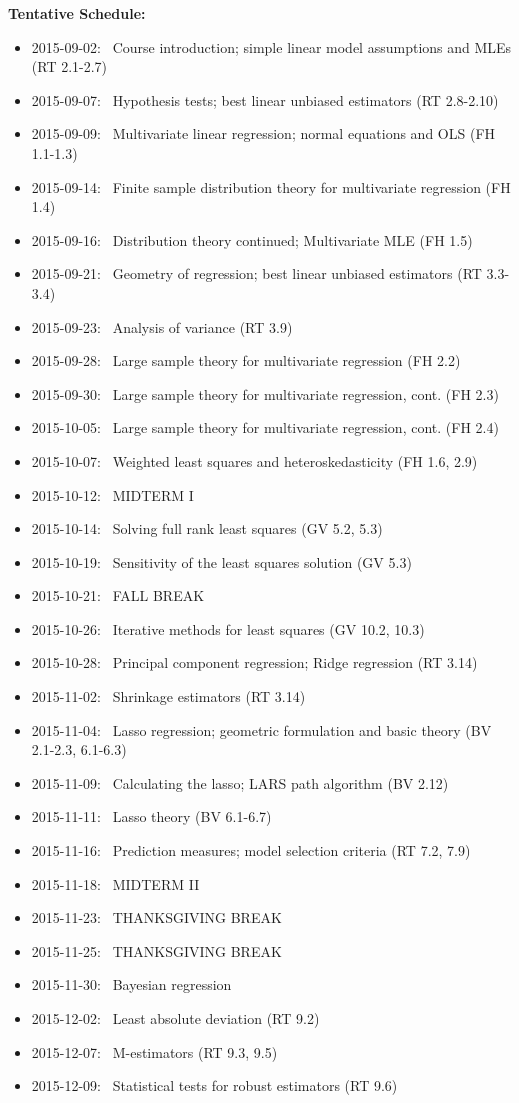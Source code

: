 \documentclass[12pt]{article}
\begin{document}
{\bf Tentative Schedule:}
\begin{itemize}\setlength\itemsep{0em}
\item 2015-09-02: \, Course introduction; simple linear model assumptions and MLEs (RT 2.1-2.7)
\item 2015-09-07: \, Hypothesis tests; best linear unbiased estimators (RT 2.8-2.10)
\item 2015-09-09: \, Multivariate linear regression; normal equations and OLS (FH 1.1-1.3)
\item 2015-09-14: \, Finite sample distribution theory for multivariate regression (FH 1.4)
\item 2015-09-16: \, Distribution theory continued; Multivariate MLE (FH 1.5)
\item 2015-09-21: \, Geometry of regression; best linear unbiased estimators (RT 3.3-3.4)
\item 2015-09-23: \, Analysis of variance (RT 3.9)
\item 2015-09-28: \, Large sample theory for multivariate regression (FH 2.2)
\item 2015-09-30: \, Large sample theory for multivariate regression, cont. (FH 2.3)
\item 2015-10-05: \, Large sample theory for multivariate regression, cont. (FH 2.4)
\item 2015-10-07: \, Weighted least squares and heteroskedasticity (FH 1.6, 2.9)
\item 2015-10-12: \, MIDTERM I
\item 2015-10-14: \, Solving full rank least squares (GV 5.2, 5.3)
\item 2015-10-19: \, Sensitivity of the least squares solution (GV 5.3)
\item 2015-10-21: \, FALL BREAK
\item 2015-10-26: \, Iterative methods for least squares (GV 10.2, 10.3)
\item 2015-10-28: \, Principal component regression; Ridge regression (RT 3.14)
\item 2015-11-02: \, Shrinkage estimators (RT 3.14)
\item 2015-11-04: \, Lasso regression; geometric formulation and basic theory (BV 2.1-2.3, 6.1-6.3)
\item 2015-11-09: \, Calculating the lasso; LARS path algorithm (BV 2.12)
\item 2015-11-11: \, Lasso theory (BV 6.1-6.7)
\item 2015-11-16: \, Prediction measures; model selection criteria (RT 7.2, 7.9)
\item 2015-11-18: \, MIDTERM II
\item 2015-11-23: \, THANKSGIVING BREAK
\item 2015-11-25: \, THANKSGIVING BREAK
\item 2015-11-30: \, Bayesian regression
\item 2015-12-02: \, Least absolute deviation (RT 9.2)
\item 2015-12-07: \, M-estimators (RT 9.3, 9.5)
\item 2015-12-09: \, Statistical tests for robust estimators (RT 9.6)
\end{itemize}
\end{document}
